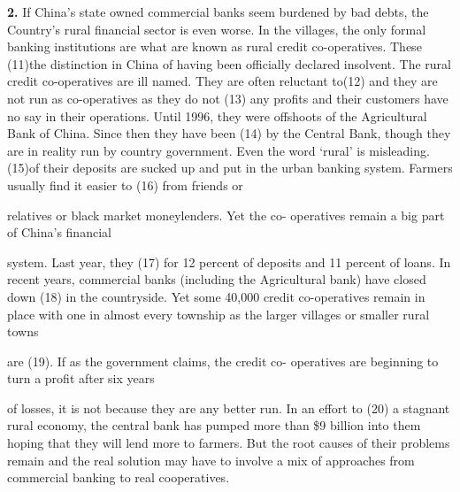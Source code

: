 \documentclass[a4paper,30pt]{report}
\begin{document}
     \textbf{2.} If China’s state owned commercial banks seem
burdened by bad debts, the Country’s rural financial
sector is even worse. In the villages, the only formal
banking institutions are what are known as rural credit
co-operatives. These (11)the distinction in China of
having been officially declared insolvent. The rural
credit co-operatives are ill named. They are often
reluctant to(12) and they are not run as co-operatives
as they do not (13) any profits and their customers
have no say in their operations. Until 1996, they were
offshoots of the Agricultural Bank of China. Since
then they have been (14) by the Central Bank, though
they are in reality run by country government. Even
the word ‘rural’ is misleading. (15)of their deposits are
sucked up and put in the urban banking system.
Farmers usually find it easier to (16) from friends or

relatives or black market moneylenders. Yet the co-
operatives remain a big part of China’s financial

system. Last year, they (17) for 12 percent of deposits
and 11 percent of loans. In recent years, commercial
banks (including the Agricultural bank) have closed
down (18) in the countryside. Yet some 40,000 credit
co-operatives remain in place with one in almost every
township as the larger villages or smaller rural towns

are (19). If as the government claims, the credit co-
operatives are beginning to turn a profit after six years

of losses, it is not because they are any better run. In an
effort to (20) a stagnant rural economy, the central
bank has pumped more than \$9 billion into them
hoping that they will lend more to farmers. But the
root causes of their problems remain and the real
solution may have to involve a mix of approaches from
commercial banking to real cooperatives.\\\\
\end{document}
